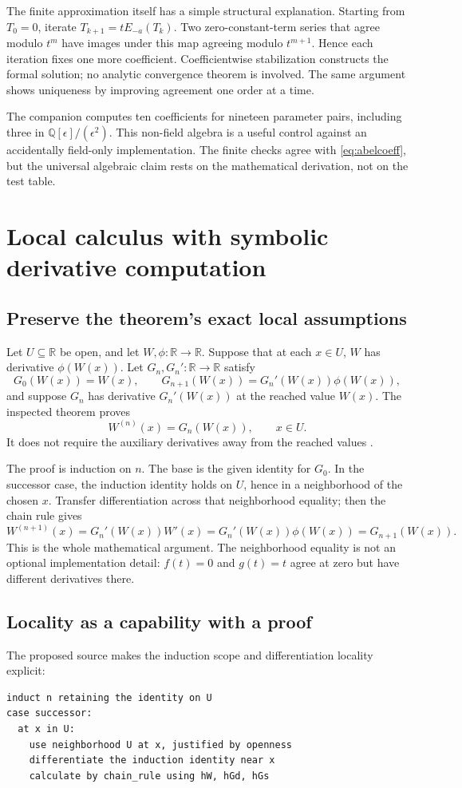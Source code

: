 \documentclass[11pt,letterpaper]{article}
\newcommand{\Q}{\mathbb Q}
\newcommand{\R}{\mathbb R}
\theoremstyle{definition}
\begin{document}
The finite approximation itself has a simple structural explanation. Starting
from \(T_0=0\), iterate
\(T_{k+1}=tE_{-a}(T_k)\). Two zero-constant-term series that agree modulo \(t^m\)
have images under this map agreeing modulo \(t^{m+1}\). Hence each iteration fixes
one more coefficient. Coefficientwise stabilization constructs the formal
solution; no analytic convergence theorem is involved. The same argument shows
uniqueness by improving agreement one order at a time.

The companion computes ten coefficients for nineteen parameter pairs, including
three in \(\Q[\epsilon]/(\epsilon^2)\). This non-field algebra is a useful control
against an accidentally field-only implementation. The finite checks agree with
\eqref{eq:abelcoeff}, but the universal algebraic claim rests on the mathematical
derivation, not on the test table.

\section{Local calculus with symbolic derivative computation}\label{sec:calculus}
\subsection{Preserve the theorem's exact local assumptions}
Let \(U\subseteq\R\) be open, and let \(W,\phi:\R\to\R\). Suppose that at each
\(x\in U\), \(W\) has derivative \(\phi(W(x))\). Let \(G_n,G_n':\R\to\R\) satisfy
\[
 G_0(W(x))=W(x),\qquad
 G_{n+1}(W(x))=G_n'(W(x))\phi(W(x)),
\]
and suppose \(G_n\) has derivative \(G_n'(W(x))\) at the reached value \(W(x)\).
The inspected theorem proves
\begin{equation}\label{eq:autonomous}
 W^{(n)}(x)=G_n(W(x)),\qquad x\in U.
\end{equation}
It does not require the auxiliary derivatives away from the reached values
\cite{pode}.

The proof is induction on \(n\). The base is the given identity for \(G_0\). In the
successor case, the induction identity holds on \(U\), hence in a neighborhood of
the chosen \(x\). Transfer differentiation across that neighborhood equality;
then the chain rule gives
\[
 W^{(n+1)}(x)=G_n'(W(x))W'(x)
 =G_n'(W(x))\phi(W(x))=G_{n+1}(W(x)).
\]
This is the whole mathematical argument. The neighborhood equality is not an
optional implementation detail: \(f(t)=0\) and \(g(t)=t\) agree at zero but have
different derivatives there.

\subsection{Locality as a capability with a proof}
The proposed source makes the induction scope and differentiation locality explicit:
\begin{lstlisting}
induct n retaining the identity on U
case successor:
  at x in U:
    use neighborhood U at x, justified by openness
    differentiate the induction identity near x
    calculate by chain_rule using hW, hGd, hGs
\end{lstlisting}
\end{document}
